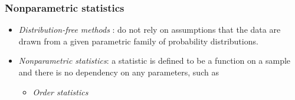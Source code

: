 \begin{frame}[fragile]
	\frametitle{Nonparametric statistics}
	\begin{itemize}
		\item \normalsize {\it Distribution-free methods} : do not rely on assumptions that the data are drawn from a given parametric family of probability distributions. \\[2em]
		\item \normalsize {\it Nonparametric statistics}: a statistic is defined to be a function on a sample and there is no dependency on any parameters, such as
		\bigskip
		\begin{itemize}
			\item \normalsize {\it Order statistics}
		\end{itemize}
	\end{itemize}
\end{frame}

